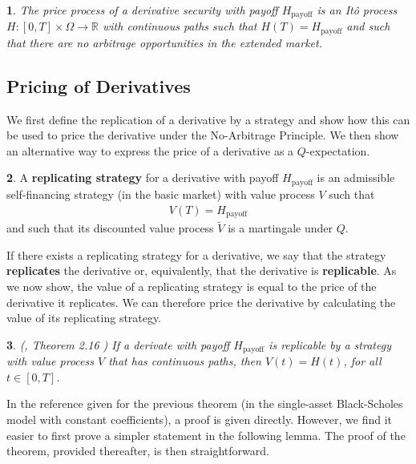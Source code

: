 \documentclass[english]{article}
\numberwithin{equation}{section}
\numberwithin{figure}{section}
\theoremstyle{bolddescit}
\newtheorem{theorem}{\protect\theoremname}[section]
\theoremstyle{definition}
\newtheorem{definition}[theorem]{\protect\definitionname}
\theoremstyle{definition}
\theoremstyle{plain}
\theoremstyle{plain}
\theoremstyle{bolddesc}
\newtheorem{assumption}[theorem]{\protect\assumptionname}
\theoremstyle{plain}
\theoremstyle{remark}
\providecommand{\assumptionname}{Assumption}
\providecommand{\definitionname}{Definition}
\providecommand{\theoremname}{Theorem}
\begin{document}
\begin{assumption}\label{ass:bs-derivative-regularity}
  The price process of a derivative security with payoff $H_\text{payoff}$ is an It\^o process $H : [0,T] \times \Omega \to \mathbb{R}$ with continuous paths such that $H(T) = H_\text{payoff}$ and such that there are no arbitrage opportunities in the extended market.
\end{assumption}

\subsection{Pricing of Derivatives}

We first define the replication of a derivative by a strategy and show how this can be used to price the derivative under the No-Arbitrage Principle. We then show an alternative way to express the price of a derivative as a $Q$-expectation.

\begin{definition}
  A \textbf{replicating strategy} for a derivative with payoff $H_\text{payoff}$ is an admissible self-financing strategy (in the basic market) with value process $V$ such that
  \begin{align*}
    V(T) = H_\text{payoff}
  \end{align*}
  and such that its discounted value process $\widetilde{V}$ is a martingale under $Q$.
\end{definition}

If there exists a replicating strategy for a derivative, we say that the strategy \textbf{replicates} the derivative or, equivalently, that the derivative is \textbf{replicable}. As we now show, the value of a replicating strategy is equal to the price of the derivative it replicates. We can therefore price the derivative by calculating the value of its replicating strategy.

\begin{theorem}\label{thm:bs-repl-strat-derivative-prices}
  (\cite{capinski_blackscholes_2012}, Theorem 2.16 )
  If a derivate with payoff $H_\text{payoff}$ is replicable by a strategy with value process $V$ that has continuous paths, then $V(t) = H(t)$, for all $t \in [0,T]$.
\end{theorem}

In the reference given for the previous theorem (in the single-asset Black-Scholes model with constant coefficients), a proof is given directly. However, we find it easier to first prove a simpler statement in the following lemma. The proof of the theorem, provided thereafter, is then straightforward.
\end{document}
